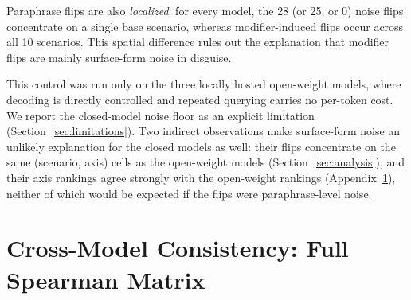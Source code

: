 \documentclass[11pt]{article}
\begin{document}
Paraphrase flips are also \emph{localized}: for every model, the 28 (or 25, or 0) noise flips concentrate on a single base scenario, whereas modifier-induced flips occur across all 10 scenarios. This spatial difference rules out the explanation that modifier flips are mainly surface-form noise in disguise.

This control was run only on the three locally hosted open-weight models, where decoding is directly controlled and repeated querying carries no per-token cost. We report the closed-model noise floor as an explicit limitation (Section~\ref{sec:limitations}). Two indirect observations make surface-form noise an unlikely explanation for the closed models as well: their flips concentrate on the same (scenario, axis) cells as the open-weight models (Section~\ref{sec:analysis}), and their axis rankings agree strongly with the open-weight rankings (Appendix~\ref{app:crossmodel}), neither of which would be expected if the flips were paraphrase-level noise.

\section{Cross-Model Consistency: Full Spearman Matrix}
\label{app:crossmodel}

\begin{table}[t]
\centering
\footnotesize
\setlength{\tabcolsep}{3pt}
\caption{Full pairwise Spearman $\rho$ across the per-axis (8-axis) flip-rate ordering of all seven LLMs and the utility baseline. Bold marks $p<0.05$. Mean LLM--LLM $\rho = 0.51$. $\ddagger$ denotes closed frontier models.}
\label{tab:crossmodel}
\end{table}
\end{document}
